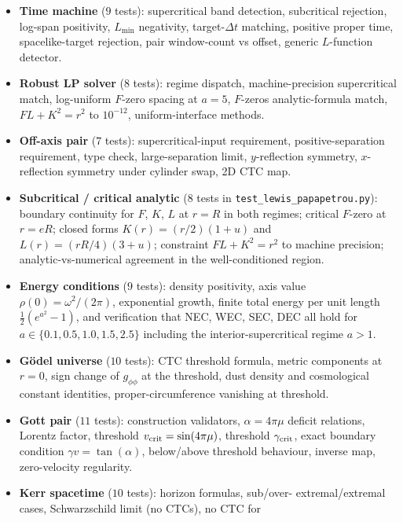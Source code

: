 \documentclass[11pt,a4paper]{article}
\begin{document}
\begin{itemize}[leftmargin=*]
(timelike iff $|\Omega r| < 1$), $\Omega$-bound recovery
$\Omega_\pm = \pm 1/r$, revolution periods, CTC region flag,
target-time inverse, negative-$\Omega$ for backward time travel.
\item \textbf{Time machine} ($9$ tests): supercritical band detection,
subcritical rejection, log-span positivity, $L_{\min}$ negativity,
target-$\Delta t$ matching, positive proper time, spacelike-target
rejection, pair window-count vs offset, generic $L$-function
detector.
\item \textbf{Robust LP solver} ($8$ tests): regime dispatch, machine-precision
supercritical match, log-uniform $F$-zero spacing at $a = 5$, $F$-zeros
analytic-formula match, $F L + K^2 = r^2$ to $10^{-12}$, uniform-interface
methods.
\item \textbf{Off-axis pair} ($7$ tests): supercritical-input requirement,
positive-separation requirement, type check, large-separation limit,
$y$-reflection symmetry, $x$-reflection symmetry under cylinder swap, 2D
CTC map.
\item \textbf{Subcritical / critical analytic} ($8$ tests in
\texttt{test\_lewis\_papapetrou.py}): boundary continuity for $F$, $K$,
$L$ at $r = R$ in both regimes; critical $F$-zero at $r = e R$; closed
forms $K(r) = (r/2)(1 + u)$ and $L(r) = (r R/4)(3 + u)$; constraint
$F L + K^2 = r^2$ to machine precision; analytic-vs-numerical
agreement in the well-conditioned region.
\item \textbf{Energy conditions} ($9$ tests): density positivity, axis
value $\rho(0) = \omega^2 / (2\pi)$, exponential growth, finite total
energy per unit length $\tfrac{1}{2}(e^{a^2} - 1)$, and verification
that NEC, WEC, SEC, DEC all hold for $a \in \{0.1, 0.5, 1.0, 1.5, 2.5\}$
including the interior-supercritical regime $a > 1$.
\item \textbf{G\"odel universe} ($10$ tests): CTC threshold formula,
metric components at $r = 0$, sign change of $g_{\phi\phi}$ at the
threshold, dust density and cosmological constant identities,
proper-circumference vanishing at threshold.
\item \textbf{Gott pair} ($11$ tests): construction validators,
$\alpha = 4\pi\mu$ deficit relations, Lorentz factor, threshold
$v_{\rm crit} = \sin(4\pi\mu)$, threshold $\gamma_{\rm crit}$, exact
boundary condition $\gamma v = \tan(\alpha)$, below/above threshold
behaviour, inverse map, zero-velocity regularity.
\item \textbf{Kerr spacetime} ($10$ tests): horizon formulas, sub/over-
extremal/extremal cases, Schwarzschild limit (no CTCs), no CTC for

\end{itemize}
\end{document}
